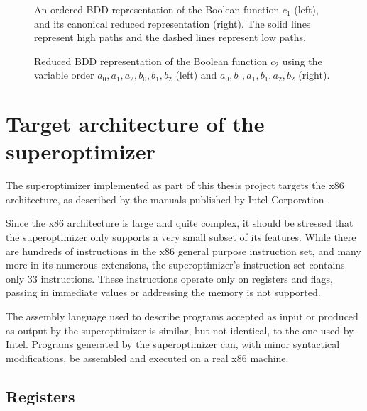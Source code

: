 \documentclass[a4paper,11pt]{kth-mag}
\begin{document}
\begin{figure}[p]
\centering

\caption{An ordered BDD representation of the Boolean function $c_1$ (left), and its canonical reduced representation (right). The solid lines represent high paths and the dashed lines represent low paths.}
\label{fig:bdd_c1}
\end{figure}

\begin{figure}[p]
\centering

\caption{Reduced BDD representation of the Boolean function $c_2$ using the variable order $a_0,a_1,a_2,b_0,b_1,b_2$ (left) and $a_0,b_0,a_1,b_1,a_2,b_2$ (right).}
\label{fig:bdd_c2_bad}
\end{figure}

\chapter{Target architecture of the superoptimizer}
\label{ch:target_architecture}

The superoptimizer implemented as part of this thesis project targets the x86 architecture, as described by the manuals published by Intel Corporation \cite{intel_1,intel_2a,intel_2b}.

Since the x86 architecture is large and quite complex, it should be stressed that the superoptimizer only supports a very small subset of its features.
While there are hundreds of instructions in the x86 general purpose instruction set, and many more in its numerous extensions, the superoptimizer's instruction set contains only 33 instructions.
These instructions operate only on registers and flags, passing in immediate values or addressing the memory is not supported.

The assembly language used to describe programs accepted as input or produced as output by the superoptimizer is similar, but not identical, to the one used by Intel.
Programs generated by the superoptimizer can, with minor syntactical modifications, be assembled and executed on a real x86 machine.


\section{Registers}
\end{document}
